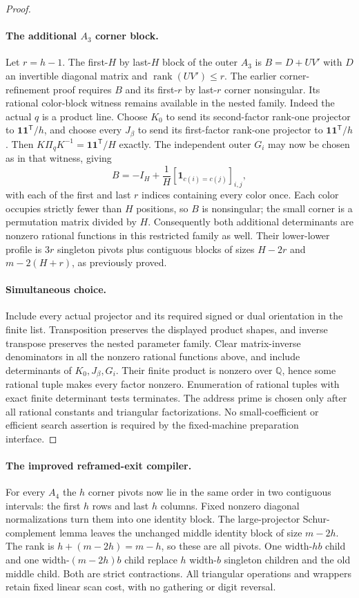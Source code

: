 \begin{proof}
\paragraph{The additional $A_3$ corner block.}
Let $r=h-1$. The first-$H$ by last-$H$ block of the outer $A_3$ is
$B=D+UV'$ with $D$ an invertible diagonal matrix and
$\operatorname{rank}(UV')\le r$. The earlier corner-refinement proof
requires $B$ and its first-$r$ by last-$r$ corner nonsingular.
Its rational color-block witness remains available in the nested family.
Indeed the actual $q$ is a product line. Choose $K_0$ to send its
second-factor rank-one projector to $\mathbf1\mathbf1^{\mathsf T}/h$,
and choose every $J_\beta$ to send its first-factor rank-one projector
to $\mathbf1\mathbf1^{\mathsf T}/h$. Then
$K\Pi_qK^{-1}=\mathbf1\mathbf1^{\mathsf T}/H$ exactly.
The independent outer $G_i$ may now be chosen as in that witness, giving
\[
 B=-I_H+\frac1H[\mathbf1_{c(i)=c(j)}]_{i,j},
\]
with each of the first and last $r$ indices containing every color once.
Each color occupies strictly fewer than $H$ positions, so $B$ is
nonsingular; the small corner is a permutation matrix divided by $H$.
Consequently both additional determinants are nonzero rational functions
in this restricted family as well. Their lower-lower profile is
$3r$ singleton pivots plus contiguous blocks of sizes $H-2r$ and
$m-2(H+r)$, as previously proved.

\paragraph{Simultaneous choice.}
Include every actual projector and its required signed or dual orientation
in the finite list. Transposition preserves the displayed product shapes,
and inverse transpose preserves the nested parameter family. Clear
matrix-inverse denominators in all the nonzero rational functions above,
and include determinants of $K_0,J_\beta,G_i$. Their finite product is
nonzero over $\mathbb Q$, hence some rational tuple makes every factor
nonzero. Enumeration of rational tuples with exact finite determinant
tests terminates. The address prime is chosen only after all rational
constants and triangular factorizations. No small-coefficient or efficient
search assertion is required by the fixed-machine preparation interface.
\end{proof}

\paragraph{The improved reframed-exit compiler.}
For every $A_4$ the $h$ corner pivots now lie in the same order in two
contiguous intervals: the first $h$ rows and last $h$ columns. Fixed
nonzero diagonal normalizations turn them into one identity block.
The large-projector Schur-complement lemma leaves the unchanged middle
identity block of size $m-2h$. The rank is $h+(m-2h)=m-h$, so these are
all pivots. One width-$hb$ child and one width-$(m-2h)b$ child replace
$h$ width-$b$ singleton children and the old middle child. Both are strict
contractions. All triangular operations and wrappers retain fixed linear
scan cost, with no gathering or digit reversal.

